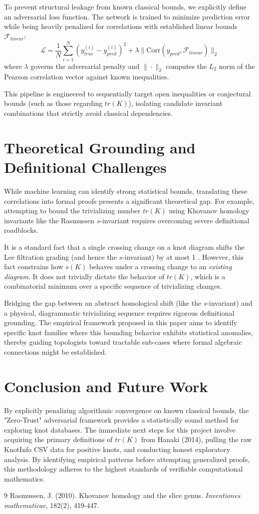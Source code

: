 \documentclass[12pt]{article}
\begin{document}
To prevent structural leakage from known classical bounds, we explicitly define an adversarial loss function. The network is trained to minimize prediction error while being heavily penalized for correlations with established linear bounds $\mathcal{F}_{linear}$:
\begin{equation}
\mathcal{L} = \frac{1}{N} \sum_{i=1}^{N} \left( y_{true}^{(i)} - y_{pred}^{(i)} \right)^2 + \lambda \| \text{Corr}(y_{pred}, \mathcal{F}_{linear}) \|_2
\end{equation}
where $\lambda$ governs the adversarial penalty and $\| \cdot \|_2$ computes the $L_2$ norm of the Pearson correlation vector against known inequalities. 

This pipeline is engineered to sequentially target open inequalities or conjectural bounds (such as those regarding $tr(K)$), isolating candidate invariant combinations that strictly avoid classical dependencies.

\section{Theoretical Grounding and Definitional Challenges}
\label{sec:theory}
While machine learning can identify strong statistical bounds, translating these correlations into formal proofs presents a significant theoretical gap. For example, attempting to bound the trivializing number $tr(K)$ using Khovanov homology invariants like the Rasmussen $s$-invariant requires overcoming severe definitional roadblocks.

It is a standard fact that a single crossing change on a knot diagram shifts the Lee filtration grading (and hence the $s$-invariant) by at most 1 \cite{rasmussen2010}. However, this fact constrains how $s(K)$ behaves under a crossing change to an \textit{existing diagram}. It does not trivially dictate the behavior of $tr(K)$, which is a combinatorial minimum over a specific sequence of trivializing changes. 

Bridging the gap between an abstract homological shift (like the $s$-invariant) and a physical, diagrammatic trivializing sequence requires rigorous definitional grounding. The empirical framework proposed in this paper aims to identify specific knot families where this bounding behavior exhibits statistical anomalies, thereby guiding topologists toward tractable sub-cases where formal algebraic connections might be established.

\section{Conclusion and Future Work}
\label{sec:conclusion}
By explicitly penalizing algorithmic convergence on known classical bounds, the "Zero-Trust" adversarial framework provides a statistically sound method for exploring knot databases. The immediate next steps for this project involve acquiring the primary definitions of $tr(K)$ from Hanaki (2014), pulling the raw KnotInfo CSV data for positive knots, and conducting honest exploratory analysis. By identifying empirical patterns before attempting generalized proofs, this methodology adheres to the highest standards of verifiable computational mathematics.

\begin{thebibliography}{9}
Rasmussen, J. (2010). Khovanov homology and the slice genus. \textit{Inventiones mathematicae}, 182(2), 419-447.
\end{thebibliography}
\end{document}
